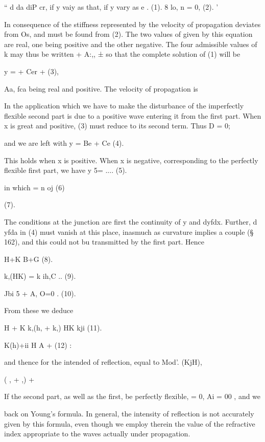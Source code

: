 `` d da diP cr, if y vaiy as that, if y vary as e . (1). 8 lo, n = 0, (2). '

In consequence of the stiffness represented by the velocity of
propagation deviates from Os, and must be found from (2). The two values
of given by this equation are real, one being positive and the other
negative. The four admissible values of k may thus
be written + A:,, ± so that the complete solution of (1) will be

y = + Cer + (3),

Aa, fca being real and positive. The velocity of propagation is

In the application which we have to make the disturbance of the
imperfectly flexible second part is due to a positive wave entering it
from the first part. When x is great and positive, (3) must reduce to
its second term. Thus D = 0;

and we are left with y = Be + Ce (4).

This holds when x is positive. When x is negative, corresponding to the
perfectly flexible first part, we have y 5= ....
(5).

in which = n oj
(6)

(7).

The conditions at the junction are first the continuity of y and dyfdx.
Further, d yfda in (4) must vanish at this place, inasmuch as curvature
implies a couple (§ 162), and this could not bu transmitted by the first
part. Hence

H+K B+G (8).

k,(HK) = k ih,C ..  (9).

Jbi 5 + A, O=0 . (10).

From these we deduce

H + K k,(h, + k,) HK kji (11).

K(h)+ii H A + (12) :

and thence for the intended of reflection, equal to Mod'. (KjH),

( , + ,) +

If the second part, as well as the first, be perfectly flexible, = 0, Ai
= 00 , and we

back on Young's formula. In general, the intensity of reflection is not
accurately given by this formula, even though we employ therein the
value of the refractive index appropriate to the waves actually under
propagation.
